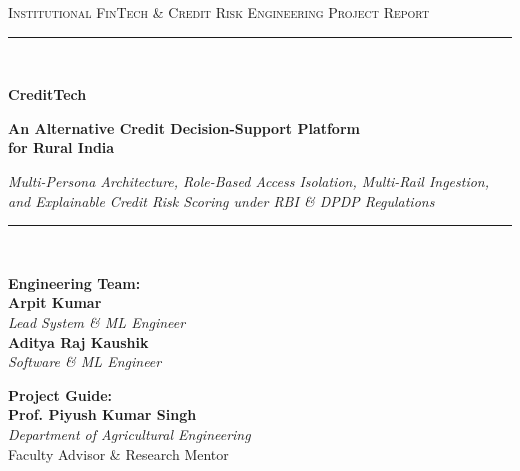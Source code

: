 \begin{titlepage}
\centering
\vspace*{0.5cm}

{\scshape\Large Institutional FinTech \& Credit Risk Engineering Project Report \par}
\vspace{0.8cm}

{\color{primary}\rule{\linewidth}{2pt}}\\[0.4cm]

{\Huge\bfseries\color{primary} CreditTech \par}
\vspace{0.3cm}
{\Large\bfseries\color{secondary} An Alternative Credit Decision-Support Platform \\ for Rural India \par}
\vspace{0.2cm}
{\large\itshape Multi-Persona Architecture, Role-Based Access Isolation, Multi-Rail Ingestion, and Explainable Credit Risk Scoring under RBI \& DPDP Regulations \par}

{\color{primary}\rule{\linewidth}{1pt}}\\[1.5cm]

\noindent
\begin{minipage}[t]{0.48\textwidth}
  \begin{flushleft}
    {\large\textbf{\color{primary}Engineering Team:}}\\[0.25cm]
    \textbf{\color{secondary}Arpit Kumar}\\
    {\small\textit{Lead System \& ML Engineer}}\\[0.25cm]
    \textbf{\color{secondary}Aditya Raj Kaushik}\\
    {\small\textit{Software \& ML Engineer}}
  \end{flushleft}
\end{minipage}
\hfill
\begin{minipage}[t]{0.48\textwidth}
  \begin{flushright}
    {\large\textbf{\color{primary}Project Guide:}}\\[0.25cm]
    \textbf{\color{secondary}Prof. Piyush Kumar Singh}\\
    {\small\textit{Department of Agricultural Engineering}}\\[0.25cm]
    {\footnotesize\color{slate}Faculty Advisor \& Research Mentor}
  \end{flushright}
\end{minipage}


\end{titlepage}
